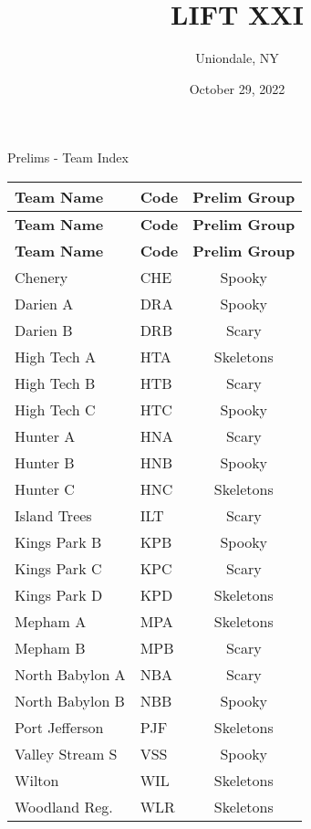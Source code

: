 \documentclass{article}%
\title{LIFT XXI}%
\author{Uniondale, NY}%
\date{October 29, 2022}%
\begin{document}
%
\normalsize%
%
\maketitle%
\vspace*{48pt}%
\begin{center}%
\begin{Huge}%
Prelims {-} Team Index%
\end{Huge}%
\end{center}%
\newpage%
\pagestyle{fancy}%
\fancyhf{}%
%
%
%
%
%
\begin{longtable}{|ll|c|}%
\rowcolor{gray!30}%
\hline%
\textbf{Team Name} & \textbf{Code}&\textbf{Prelim Group}\\%
\hline%
\endhead%
\hline%
\rowcolor{gray!25}%
\textbf{Team Name} & \textbf{Code}&\textbf{Prelim Group}\\%
\hline%
\endfoot%
\hline%
\hline\rowcolor{gray!25}%
\textbf{Team Name} & \textbf{Code}&\textbf{Prelim Group}\\%
\hline%
\endlastfoot%
\hline%
Chenery&CHE&Spooky\\%
Darien A&DRA&Spooky\\%
Darien B&DRB&Scary\\%
High Tech A&HTA&Skeletons\\%
High Tech B&HTB&Scary\\%
High Tech C&HTC&Spooky\\%
Hunter A&HNA&Scary\\%
Hunter B&HNB&Spooky\\%
Hunter C&HNC&Skeletons\\%
Island Trees&ILT&Scary\\%
Kings Park B&KPB&Spooky\\%
Kings Park C&KPC&Scary\\%
Kings Park D&KPD&Skeletons\\%
Mepham A&MPA&Skeletons\\%
Mepham B&MPB&Scary\\%
North Babylon A&NBA&Scary\\%
North Babylon B&NBB&Spooky\\%
Port Jefferson&PJF&Skeletons\\%
Valley Stream S&VSS&Spooky\\%
Wilton&WIL&Skeletons\\%
Woodland Reg.&WLR&Skeletons\\%
\end{longtable}%
\end{document}
